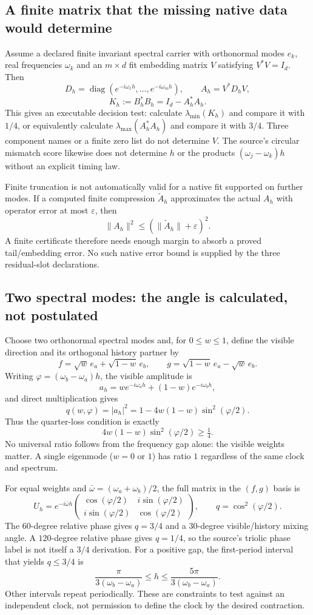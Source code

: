 \documentclass[11pt,a4paper]{article}
\begin{document}
\subsection{A finite matrix that the missing native data would determine}
Assume a declared finite invariant spectral carrier with orthonormal
modes $e_k$, real frequencies $\omega_k$ and an $m\times d$ fit
embedding matrix $V$ satisfying $V^*V=I_d$. Then
\[
 D_h=\operatorname{diag}(e^{-i\omega_1h},\ldots,e^{-i\omega_mh}),
 \qquad A_h=V^*D_hV,
\]
\[
 K_h:=B_h^*B_h=I_d-A_h^*A_h.
\]
This gives an executable decision test: calculate
$\lambda_{\min}(K_h)$ and compare it with $1/4$, or equivalently
calculate $\lambda_{\max}(A_h^*A_h)$ and compare it with $3/4$.
Three component names or a finite zero list do not determine $V$.
The source's circular mismatch score likewise does not determine $h$
or the products $(\omega_j-\omega_k)h$ without an explicit timing law.

Finite truncation is not automatically valid for a native fit supported
on further modes. If a computed finite compression $\widetilde A_h$
approximates the actual $A_h$ with operator error at most $\varepsilon$,
then
\[
 \|A_h\|^2\le(\|\widetilde A_h\|+\varepsilon)^2.
\]
A finite certificate therefore needs enough margin to absorb a proved
tail/embedding error. No such native error bound is supplied by the
three residual-slot declarations.

\subsection{Two spectral modes: the angle is calculated, not postulated}
Choose two orthonormal spectral modes and, for $0\le w\le1$, define
the visible direction and its orthogonal history partner by
\[
 f=\sqrt w\,e_a+\sqrt{1-w}\,e_b,\qquad
 g=\sqrt{1-w}\,e_a-\sqrt w\,e_b.
\]
Writing $\varphi=(\omega_b-\omega_a)h$, the visible amplitude is
\[
 a_h=w e^{-i\omega_a h}+(1-w)e^{-i\omega_b h},
\]
and direct multiplication gives
\[
 q(w,\varphi)=|a_h|^2
 =1-4w(1-w)\sin^2(\varphi/2).
\]
Thus the quarter-loss condition is exactly
\[
 4w(1-w)\sin^2(\varphi/2)\ge\tfrac14.
\]
No universal ratio follows from the frequency gap alone: the visible
weights matter. A single eigenmode ($w=0$ or $1$) has ratio $1$
regardless of the same clock and spectrum.

For equal weights and $\bar\omega=(\omega_a+\omega_b)/2$,
the full matrix in the $(f,g)$ basis is
\[
 U_h=e^{-i\bar\omega h}
 \begin{pmatrix}
 \cos(\varphi/2)&i\sin(\varphi/2)\\
 i\sin(\varphi/2)&\cos(\varphi/2)
 \end{pmatrix},\qquad q=\cos^2(\varphi/2).
\]
The $60$-degree relative phase gives $q=3/4$ and a $30$-degree
visible/history mixing angle. A $120$-degree relative phase gives
$q=1/4$, so the source's triolic phase label is not itself a
$3/4$ derivation. For a positive gap, the first-period interval
that yields $q\le3/4$ is
\[
 \frac{\pi}{3(\omega_b-\omega_a)}
 \le h\le
 \frac{5\pi}{3(\omega_b-\omega_a)}.
\]
Other intervals repeat periodically. These are constraints to test
against an independent clock, not permission to define the clock
by the desired contraction.
\end{document}
